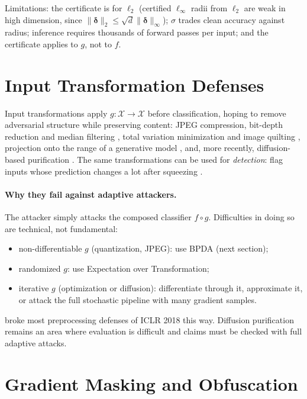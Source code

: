 \documentclass[10pt,a4paper]{extarticle}
\theoremstyle{definition}
\newcommand{\X}{\mathcal{X}}
\newcommand{\bdelta}{\boldsymbol{\delta}}
\begin{document}
Limitations: the certificate is for \(\ell_2\) (certified \(\ell_\infty\) radii from \(\ell_2\) are weak in high dimension, since \(\|\bdelta\|_2\le\sqrt{d}\|\bdelta\|_\infty\)); \(\sigma\) trades clean accuracy against radius; inference requires thousands of forward passes per input; and the certificate applies to \(g\), not to \(f\).

\section{Input Transformation Defenses}

Input transformations apply \(g:\X\to\X\) before classification, hoping to remove adversarial structure while preserving content: JPEG compression, bit-depth reduction and median filtering \citep{xu2018feature}, total variation minimization and image quilting \citep{guo2018countering}, projection onto the range of a generative model \citep{samangouei2018defensegan}, and, more recently, diffusion-based purification \citep{nie2022diffusion}. The same transformations can be used for \emph{detection}: flag inputs whose prediction changes a lot after squeezing \citep{xu2018feature}.

\paragraph{Why they fail against adaptive attackers.} The attacker simply attacks the composed classifier \(f\circ g\). Difficulties in doing so are technical, not fundamental:
\begin{itemize}
  \item non-differentiable \(g\) (quantization, JPEG): use BPDA (next section);
  \item randomized \(g\): use Expectation over Transformation;
  \item iterative \(g\) (optimization or diffusion): differentiate through it, approximate it, or attack the full stochastic pipeline with many gradient samples.
\end{itemize}
\citet{athalye2018obfuscated} broke most preprocessing defenses of ICLR 2018 this way. Diffusion purification remains an area where evaluation is difficult and claims must be checked with full adaptive attacks.

\section{Gradient Masking and Obfuscation}
\end{document}
